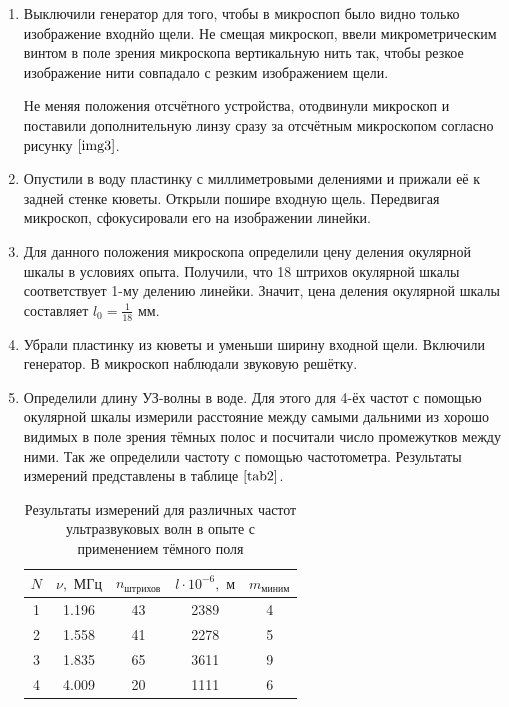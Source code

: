 \documentclass[a4paper,12pt]{article} %
\begin{document}
\begin{enumerate}
    \item Выключили генератор для того, чтобы в микроспоп было видно только изображение входнйо щели. Не смещая микроскоп, ввели микрометрическим винтом в поле зрения микроскопа вертикальную нить так, чтобы резкое изображение нити совпадало с резким изображением щели.
    
    Не меняя положения отсчётного устройства, отодвинули микроскоп и поставили дополнительную линзу сразу за отсчётным микроскопом согласно рисунку $\ref{img3}$.
    \item Опустили в воду пластинку с миллиметровыми делениями и прижали её к задней стенке кюветы. Открыли пошире входную щель. Передвигая микроскоп, сфокусировали его на изображении линейки.
    \item Для данного положения микроскопа определили цену деления окулярной шкалы в условиях опыта. Получили, что 18 штрихов окулярной шкалы соответствует 1-му делению линейки. Значит, цена деления окулярной шкалы составляет $l_0=\frac{1}{18}\text{ мм}$.
    \item Убрали пластинку из кюветы и уменьши ширину входной щели. Включили генератор. В микроскоп наблюдали звуковую решётку.
    \item Определили длину УЗ-волны в воде. Для этого для 4-ёх частот с помощью окулярной шкалы измерили расстояние между самыми дальними из хорошо видимых в поле зрения тёмных полос и посчитали число промежутков между ними. Так же определили частоту с помощью частотометра. Результаты измерений представлены в таблице $\ref{tab2}$.

    \begin{table}[h]
        \centering
        \begin{tabular}{|c|c|c|c|c|}
        \hline
    	$N$ & $\nu, \text{ МГц}$ & $n_{\text{штрихов}}$ & $l\cdot10^{-6}, \text{ м}$ & $m_{\text{миним}}$ \\ \hline
    	1 & 1.196 & 43 & 2389 & 4 \\ \hline
    	2 & 1.558 & 41 & 2278 & 5 \\ \hline
    	3 & 1.835 & 65 & 3611 & 9 \\ \hline
    	4 & 4.009 & 20 & 1111 & 6 \\ \hline
        \end{tabular}
    \caption{Результаты измерений для различных частот ультразвуковых волн в опыте с применением тёмного поля}
    \label{tab2}
    \end{table}
\end{enumerate}
\end{document}
